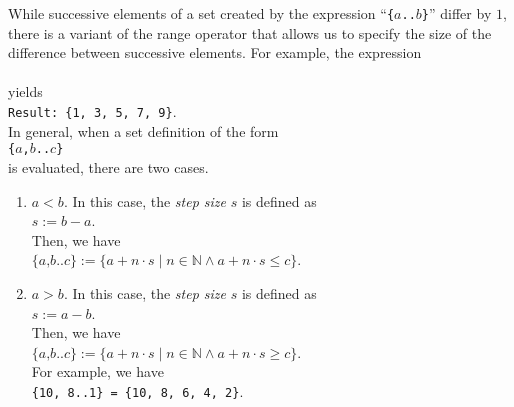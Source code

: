 While successive elements of a set created by the expression ``\texttt{\{$a$..$b$\}}''
differ by $1$, there is a variant of the range operator that allows us to
specify the size of the difference between successive elements.   For example, the expression
\\[0.2cm]
\hspace*{1.3cm}
\\[0.2cm]
yields
\\[0.2cm]
\hspace*{1.3cm}
\texttt{Result: \{1, 3, 5, 7, 9\}}.
\\[0.2cm]
In general, when a set definition of the form
\\[0.2cm]
\hspace*{1.3cm}
\texttt{\{$a$,$b$..$c$\}}
\\[0.2cm]
is evaluated, there are two cases.
\begin{enumerate}
\item $a < b$.  In this case, the \textsl{step size} $s$ is defined as
      \\[0.2cm]
      \hspace*{1.3cm}
      $s := b - a$.
      \\[0.2cm]
      Then, we have
      \\[0.2cm]
      \hspace*{1.3cm}
      $\texttt{\{$a$,$b$..$c$\}} := 
       \{ a + n \cdot s \mid n \in \mathbb{N} \wedge a + n \cdot s \leq c  \}
      $.
\item $a > b$.  In this case, the \textsl{step size} $s$ is defined as
      \\[0.2cm]
      \hspace*{1.3cm}
      $s := a - b$.
      \\[0.2cm]
      Then, we have
      \\[0.2cm]
      \hspace*{1.3cm}
      $\texttt{\{$a$,$b$..$c$\}} := 
       \{ a + n \cdot s \mid n \in \mathbb{N} \wedge a + n \cdot s \geq c  \}
      $.
      \\[0.2cm]
      For example, we have
      \\[0.2cm]
      \hspace*{1.3cm}
      \texttt{\{10, 8..1\} = \{10, 8, 6, 4, 2\}}.
\end{enumerate}

